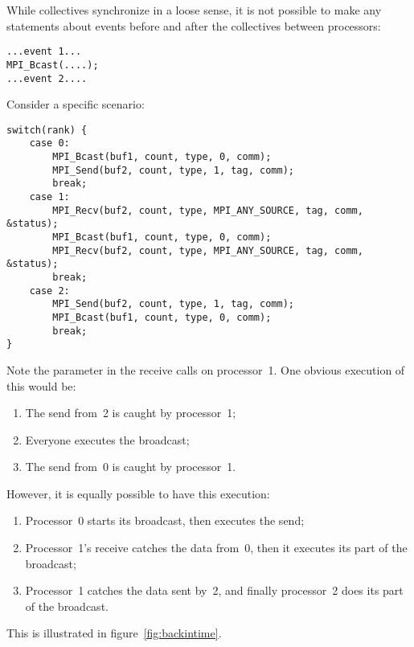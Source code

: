 While collectives synchronize in a loose sense, it is not possible to
make any statements about events before and after the collectives
between processors:
\begin{lstlisting}
...event 1...
MPI_Bcast(....);
...event 2....
\end{lstlisting}
Consider a specific scenario:
\begin{lstlisting}
switch(rank) {
    case 0:
        MPI_Bcast(buf1, count, type, 0, comm);
        MPI_Send(buf2, count, type, 1, tag, comm);
        break;
    case 1:
        MPI_Recv(buf2, count, type, MPI_ANY_SOURCE, tag, comm, &status);
        MPI_Bcast(buf1, count, type, 0, comm);
        MPI_Recv(buf2, count, type, MPI_ANY_SOURCE, tag, comm, &status);
        break;
    case 2:
        MPI_Send(buf2, count, type, 1, tag, comm);
        MPI_Bcast(buf1, count, type, 0, comm);
        break;
}
\end{lstlisting}
Note the  parameter in the receive calls on processor~1.
One obvious execution of this would be:
\begin{enumerate}
\item The send from~2 is caught by processor~1;
\item Everyone executes the broadcast;
\item The send from~0 is caught by processor~1.
\end{enumerate}
However, it is equally possible to have this execution:
\begin{enumerate}
\item Processor~0 starts its broadcast, then executes the send;
\item Processor~1's receive catches the data from~0, then it executes
  its part of the broadcast;
\item Processor~1 catches the data sent by~2, and finally processor~2
  does its part of the broadcast.
\end{enumerate}

This is illustrated in figure~\ref{fig:backintime}.
